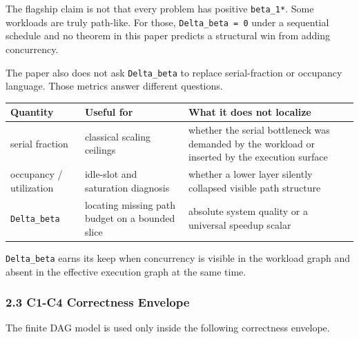 \documentclass[
  11pt,
]{article}
\newcounter{none} %
\begin{document}
The flagship claim is not that every problem has positive
\texttt{beta\_1*}. Some workloads are truly path-like. For those,
\texttt{Delta\_beta\ =\ 0} under a sequential schedule and no theorem in
this paper predicts a structural win from adding concurrency.

The paper also does not ask \texttt{Delta\_beta} to replace
serial-fraction or occupancy language. Those metrics answer different
questions.

{\def\LTcaptype{none} %
\begin{longtable}[]{@{}
  >{\raggedright\arraybackslash}p{}
  >{\raggedright\arraybackslash}p{}
  >{\raggedright\arraybackslash}p{}@{}}
\toprule\noalign{}
\begin{minipage}[b]{\linewidth}\raggedright
Quantity
\end{minipage} & \begin{minipage}[b]{\linewidth}\raggedright
Useful for
\end{minipage} & \begin{minipage}[b]{\linewidth}\raggedright
What it does not localize
\end{minipage} \\
\midrule\noalign{}
\endhead
\bottomrule\noalign{}
\endlastfoot
serial fraction & classical scaling ceilings & whether the serial
bottleneck was demanded by the workload or inserted by the execution
surface \\
occupancy / utilization & idle-slot and saturation diagnosis & whether a
lower layer silently collapsed visible path structure \\
\texttt{Delta\_beta} & locating missing path budget on a bounded slice &
absolute system quality or a universal speedup scalar \\
\end{longtable}
}

\texttt{Delta\_beta} earns its keep when concurrency is visible in the
workload graph and absent in the effective execution graph at the same
time.

\subsubsection{2.3 C1-C4 Correctness
Envelope}\label{c1-c4-correctness-envelope}

The finite DAG model is used only inside the following correctness
envelope.
\end{document}
